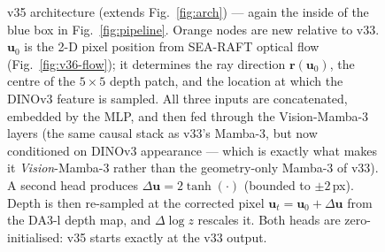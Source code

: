 \documentclass[11pt,a4paper]{article}
\begin{document}
\begin{figure}[h]
{%
}
\caption{v35 architecture (extends Fig.~\ref{fig:arch}) --- again the inside of the blue box in
Fig.~\ref{fig:pipeline}.
\textcolor{orange!80!black}{Orange} nodes are new relative to v33.
$\mathbf{u}_0$ is the 2-D pixel position from SEA-RAFT optical flow (Fig.~\ref{fig:v36-flow});
it determines the ray direction $\mathbf{r}(\mathbf{u}_0)$, the centre of the $5{\times}5$ depth
patch, and the location at which the DINOv3 feature is sampled.
All three inputs are concatenated, embedded by the MLP, and then fed through the Vision-Mamba-3
layers (the same causal stack as v33's Mamba-3, but now conditioned on DINOv3 appearance --- which is
exactly what makes it \emph{Vision}-Mamba-3 rather than the geometry-only Mamba-3 of v33).
A second head produces $\Delta\mathbf{u} = 2\tanh(\cdot)$ (bounded to $\pm 2$\,px).
Depth is then re-sampled at the corrected pixel $\mathbf{u}_t = \mathbf{u}_0 + \Delta\mathbf{u}$
from the DA3-l depth map, and $\Delta\!\log z$ rescales it.
Both heads are zero-initialised: v35 starts exactly at the v33 output.}
\label{fig:v35-arch}
\end{figure}
\end{document}
